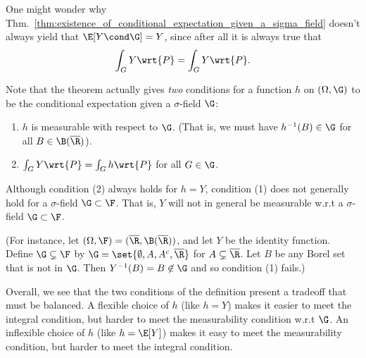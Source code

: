 \documentclass{article} %
\begin{document}
\begin{remark}
One might wonder why Thm.~\ref{thm:existence_of_conditional_expectation_given_a_sigma_field} doesn't always yield that $\E[Y \cond \G] = Y$, since after all it is always true that
\[  \int_G Y \wrt{P} = \int_G Y \wrt{P}.\]

Note that the theorem actually gives \textit{two} conditions for a function $h$ on $(\Omega, \G)$ to be the conditional expectation given a $\sigma$-field $\G$:
\begin{enumerate}
	\item $h$ is measurable with respect to $\G$.  {\scriptsize (That is, we must have $h^{-1}(B) \in \G$ for all $B \in \B(\overline{\R})$).}
	\item $\int_G Y \wrt{P} = \int_G h \wrt{P}$ for all $G \in \G$.
\end{enumerate}

Although condition (2) always holds for $h=Y$, condition (1) does not generally hold for a $\sigma$-field $\G \subset \F$. That is, $Y$ will not in general be measurable w.r.t a $\sigma$-field $\G \subset \F$. 

{\scriptsize (For instance, let $(\Omega, \F) = (\overline{\R}, \B(\overline{\R}))$, and let $Y$ be the identity function.  Define $\G \subsetneq \F$ by $\G = \set{\emptyset, A, A^c, \overline{\R}}$ for $A \subsetneq \overline{\R}$.  Let $B$ be any Borel set that is not in $\G$.  Then $Y^{-1}(B) = B \not\in \G$ and so condition (1) fails.)}

Overall, we see that the two conditions of the definition present a tradeoff that must be balanced.  A flexible choice of $h$ (like $h=Y$) makes it easier to meet the integral condition, but harder to meet the measurability condition w.r.t $\G$.  An inflexible choice of $h$ (like $h=\E[Y]$) makes it easy to meet the measurability condition, but harder to meet the integral condition.

\label{rk:two_conditions_for_existence_of_conditional_expectation_with_respect_to_a_sigma_field} 
\end{remark}
\end{document}
